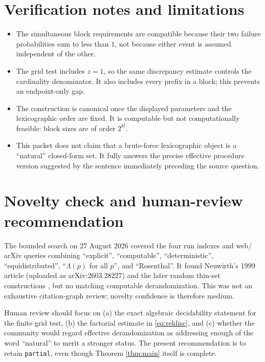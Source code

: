 \documentclass[11pt]{amsart}
\newcommand{\1}{\mathbf 1}
\theoremstyle{definition}
\theoremstyle{remark}
\begin{document}
\section*{Verification notes and limitations}

\begin{itemize}
\item The simultaneous block requirements are compatible because their two
failure probabilities sum to less than $1$, not because either event is
assumed independent of the other.
\item The grid test includes $z=1$, so the same discrepancy estimate controls
the cardinality denominator.  It also includes every prefix in a block;
this prevents an endpoint-only gap.
\item The construction is canonical once the displayed parameters and the
lexicographic order are fixed.  It is computable but not computationally
feasible: block sizes are of order $2^{k!}$.
\item This packet does not claim that a brute-force lexicographic object is a
``natural'' closed-form set.  It fully answers the precise effective
procedure version suggested by the sentence immediately preceding the
source question.
\end{itemize}

\section*{Novelty check and human-review recommendation}

The bounded search on 27 August 2026 covered the four run indexes and web/
arXiv queries combining ``explicit'', ``computable'', ``deterministic'',
``equidistributed'', ``$\Lambda(p)$ for all $p$'', and ``Rosenthal''.  It
found Neuwirth's 1999 article (uploaded as arXiv:2603.28227) and the later
random thin-set constructions \cite{LQR,LQR2}, but no matching computable
derandomization.  This was not an exhaustive citation-graph review; novelty
confidence is therefore medium.

Human review should focus on (a) the exact algebraic decidability statement
for the finite grid test, (b) the factorial estimate in
\eqref{eq:reldisc}, and (c) whether the community would regard effective
derandomization as addressing enough of the word ``natural'' to merit a
stronger status.  The present recommendation is to retain
\texttt{partial}, even though Theorem \ref{thm:main} itself is complete.
\end{document}
